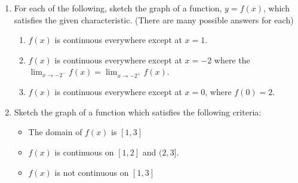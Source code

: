 \documentclass[12pt]{article}
\newif\ifans
\begin{document}
\begin{enumerate}
\begin{enumerate}
\ifans{\fbox{No because $f(6)$ is undefined}}\fi

\end{enumerate}

\item For each of the following, sketch the graph of a function, $y=f(x)$, which satisfies the given characteristic.  (There are many possible answers for each)

\begin{enumerate}

\item $f(x)$ is continuous everywhere except at $x=1$.

\ifans{\fbox{\parbox{1\linewidth}{Any graph for which either $f(1)$ is undefined or $\displaystyle \lim_{x \rightarrow 1}{f(x)}$ DNE or $\displaystyle \lim_{x \rightarrow 1}{f(x)} \neq f(1)$}}}\fi

\item $f(x)$ is continuous everywhere except at $x=-2$ where the $\displaystyle \lim_{x \rightarrow -2^-}{f(x)}=\lim_{x \rightarrow -2^+}{f(x)}$.

\ifans{\fbox{Any graph for which either $f(-2)$ is undefined or $\displaystyle \lim_{x \rightarrow -2}{f(x)} \neq f(-2)$}}\fi

\item $f(x)$ is continuous everywhere except at $x=0$, where $f(0)=2$.

\ifans{\fbox{Any graph for which $\displaystyle \lim_{x \rightarrow 0}{f(x)}$ DNE or $\displaystyle \lim_{x \rightarrow 0}{f(x)} \neq 2$}}\fi

\end{enumerate}

\item Sketch the graph of a function which satisfies the following criteria:

\begin{itemize}

\item The domain of $f(x)$ is $[1,3]$

\item $f(x)$ is continuous on $[1,2]$ and $(2,3]$.

\item $f(x)$ is not continuous on $[1,3]$

\end{itemize}


\end{enumerate}
\end{document}
